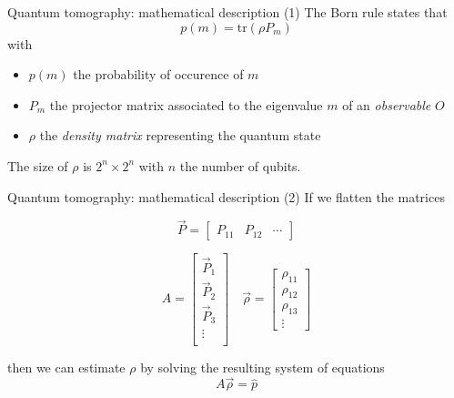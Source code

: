 \documentclass{beamer}
\newcommand{\tr}{\text{tr}}
\begin{document}
\begin{frame}{Quantum tomography: mathematical description (1)}
    The Born rule states that
    \begin{equation}
        p(m) = \tr(\rho P_m)
    \end{equation}
    with
    \begin{itemize}
        \item $p(m)$ the probability of occurence  of $m$
        \item $P_m$ the projector matrix associated to the eigenvalue $m$ of an \textit{observable} $O$
        \item $\rho$ the \textit{density matrix} representing the quantum state 
    \end{itemize}
    
    The size of $\rho$ is  $2^n \times 2^n$ with $n$ the number of qubits.
\end{frame}
\begin{frame}{Quantum tomography: mathematical description (2)}
    If we flatten the matrices

    \begin{equation}
        \vec P = \begin{bmatrix}
            P_{11} & P_{12} & \cdots
        \end{bmatrix}
    \end{equation}

    \begin{equation}
        A = \begin{bmatrix}
            \vec P_{1}\\
            \vec P_{2}\\
            \vec P_{3}\\
            \vdots  \\
        \end{bmatrix}
        \quad\vec{\rho} = \begin{bmatrix}
            \rho_{11} \\
            \rho_{12} \\
            \rho_{13} \\
            \vdots
        \end{bmatrix}
    \end{equation}

    then we can estimate $\rho$ by solving the resulting system of equations 
    \begin{equation}
        A\vec{\rho} = \hat p
    \end{equation}
\end{frame}
\end{document}
